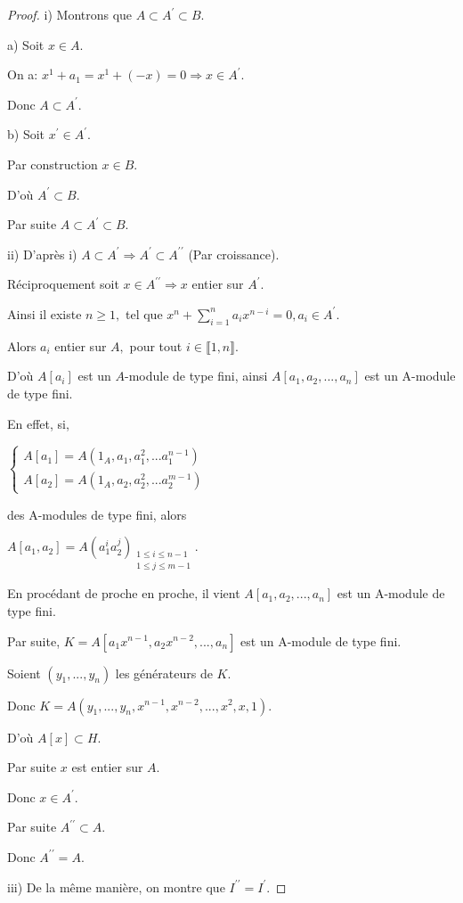 \begin{proof}
	i) Montrons que $A\subset A^{\prime }\subset B$.
	
	a) Soit $x\in A.$
	
	On a: $x^{1}+a_{1}=x^{1}+(-x)=0\Rightarrow x\in A^{\prime }.$
	
	Donc $A\subset A^{\prime }.$
	
	b) Soit $x^{\prime }\in A^{\prime }.$ 
	
	Par construction $x\in B.$
	
	D'où $A^{\prime }\subset B.$
	
	Par suite $A \subset A^{\prime }\subset B$.
	
	ii) D'après i) $A\subset A^{\prime }\Rightarrow A^{\prime }\subset
	A^{\prime \prime }$ (Par croissance).
	
	Réciproquement soit $x\in A^{\prime \prime }\Rightarrow x$ entier sur $
	A^{\prime }$.
	
	Ainsi il existe $n\geq 1,$ tel que  $x^{n}+\sum
	\limits_{i=1}^{n}a_{i}x^{n-i}=0,a_{i}\in A^{\prime }.$
	
	Alors $a_{i}$ entier sur $A,$ pour tout $i\in \llbracket 1, n \rrbracket.$
	
	D'où $A[a_{i}]$ est un $A$-module de type fini, ainsi $A[a_{1},a_{2},...,a_{n}]$ est un A-module de type fini.
	
	En effet, si,
	
	$\left\{ 
	\begin{array}{c}
		A[a_{1}]=A(1_{A},a_{1},a_{1}^{2},...a_{1}^{n-1}) \\ 
		A[a_{2}]=A(1_{A},a_{2},a_{2}^{2},...a_{2}^{m-1})
	\end{array}
	\right. $
	
	des A-modules de type fini, alors 
	
	$A[a_{1},a_{2}]=A(a_{1}^{i}a_{2}^{j})_{\substack{ 1\leq i\leq n-1 \\ 1\leq
			j\leq m-1}}$.
	
	En procédant de proche en proche, il vient $A[a_{1},a_{2},...,a_{n}]$
	est un A-module de type fini.
	
	Par suite, $K=A[a_{1}x^{n-1},a_{2}x^{n-2},...,a_{n}]$ est un A-module de
	type fini.
	
	Soient $(y_{1},...,y_{n})$ les générateurs de $K.$
	
	Donc $K=A(y_{1},...,y_{n},x^{n-1},x^{n-2},...,x^{2},x,1)$.
	
	D'où $A[x]\subset H.$
	
	Par suite $x$ est entier sur $A$.
	
	Donc $x\in A^{\prime }$.
	
	Par suite $A^{\prime \prime }\subset A$.
	
	Donc  $A^{\prime \prime }=A$.
	
	iii) De la même manière, on montre que $I^{\prime \prime }=I^{\prime}.$
\end{proof}
